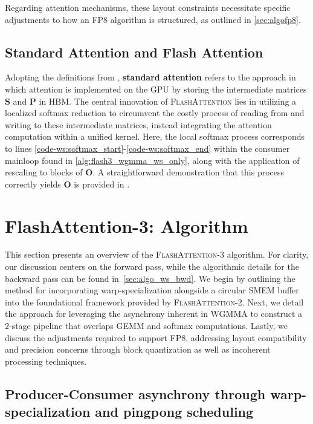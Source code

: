 Regarding attention mechanisms, these layout constraints necessitate specific adjustments to how an FP8 algorithm is structured, as outlined in \cref{sec:algofp8}.

\subsection{Standard Attention and Flash Attention} Adopting the definitions from \citet{dao2022flashattention}, \textbf{standard attention} refers to the approach in which attention is implemented on the GPU by storing the intermediate matrices $\mathbf{S}$ and $\mathbf{P}$ in HBM. The central innovation of \textsc{FlashAttention} lies in utilizing a localized softmax reduction to circumvent the costly process of reading from and writing to these intermediate matrices, instead integrating the attention computation within a unified kernel. Here, the local softmax process corresponds to lines \ref{code-ws:softmax_start}-\ref{code-ws:softmax_end} within the consumer mainloop found in \cref{alg:flash3_wgmma_ws_only}, along with the application of rescaling to blocks of $\mathbf{O}$. A straightforward demonstration that this process correctly yields $\mathbf{O}$ is provided in \cite[\S 2.3.1]{dao2023flashattention2}.

\section{FlashAttention-3: Algorithm}
\label{sec:algo}

This section presents an overview of the \textsc{FlashAttention-3} algorithm. For clarity, our discussion centers on the forward pass, while the algorithmic details for the backward pass can be found in~\cref{sec:algo_ws_bwd}. We begin by outlining the method for incorporating warp-specialization alongside a circular SMEM buffer into the foundational framework provided by \textsc{FlashAttention-2}. Next, we detail the approach for leveraging the asynchrony inherent in WGMMA to construct a 2-stage pipeline that overlaps GEMM and softmax computations. Lastly, we discuss the adjustments required to support FP8, addressing layout compatibility and precision concerns through block quantization as well as incoherent processing techniques.

\subsection{Producer-Consumer asynchrony through warp-specialization and pingpong scheduling}
\label{sec:algo_ws}

